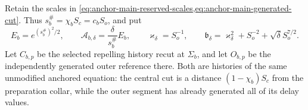 Retain the scales in
\cref{eq:anchor-main-reserved-scales,eq:anchor-main-generated-cut}.  Thus
\(s_b^\#=\chi_bS_c=c_bS_o\), and put
\begin{equation}
 E_b=e^{(s_b^\#)^2/2},\qquad
 \mathcal A_{b,\delta}=\frac{\delta}{s_b^\#}E_b,\qquad
 \varkappa_\delta=S_o^{-1},\qquad
 \mathfrak b_\delta
 =\varkappa_\delta^2+S_o^{-2}+\sqrt\delta S_o^{7/2}.
 \label{eq:lean-anchor-projective-scale}
\end{equation}
Let \(C_{b,p}\) be the selected repelling history recut at \(\Sigma_b\),
and let \(O_{b,p}\) be the independently generated outer reference there.
Both are histories of the same unmodified anchored equation: the central
cut is a distance \((1-\chi_b)S_c\) from the preparation collar, while the
outer segment has already generated all of its delay values.

